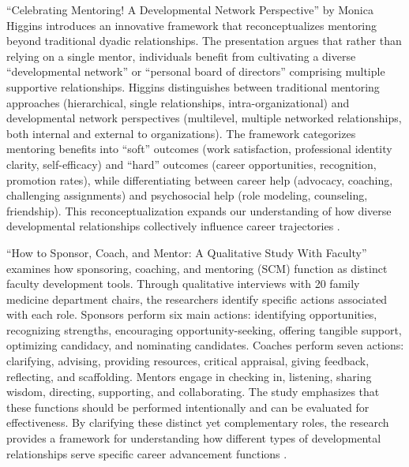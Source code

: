 \documentclass[main.tex]{subfiles}
\begin{document}
``Celebrating Mentoring! A Developmental Network Perspective'' by Monica Higgins introduces an innovative framework that reconceptualizes mentoring beyond traditional dyadic relationships. The presentation argues that rather than relying on a single mentor, individuals benefit from cultivating a diverse ``developmental network'' or ``personal board of directors'' comprising multiple supportive relationships. Higgins distinguishes between traditional mentoring approaches (hierarchical, single relationships, intra-organizational) and developmental network perspectives (multilevel, multiple networked relationships, both internal and external to organizations). The framework categorizes mentoring benefits into ``soft'' outcomes (work satisfaction, professional identity clarity, self-efficacy) and ``hard'' outcomes (career opportunities, recognition, promotion rates), while differentiating between career help (advocacy, coaching, challenging assignments) and psychosocial help (role modeling, counseling, friendship). This reconceptualization expands our understanding of how diverse developmental relationships collectively influence career trajectories \cite{higgins2023celebrating}.

``How to Sponsor, Coach, and Mentor: A Qualitative Study With Faculty'' examines how sponsoring, coaching, and mentoring (SCM) function as distinct faculty development tools. Through qualitative interviews with 20 family medicine department chairs, the researchers identify specific actions associated with each role. Sponsors perform six main actions: identifying opportunities, recognizing strengths, encouraging opportunity-seeking, offering tangible support, optimizing candidacy, and nominating candidates. Coaches perform seven actions: clarifying, advising, providing resources, critical appraisal, giving feedback, reflecting, and scaffolding. Mentors engage in checking in, listening, sharing wisdom, directing, supporting, and collaborating. The study emphasizes that these functions should be performed intentionally and can be evaluated for effectiveness. By clarifying these distinct yet complementary roles, the research provides a framework for understanding how different types of developmental relationships serve specific career advancement functions \cite{alachkar2023sponsor}.
\end{document}
